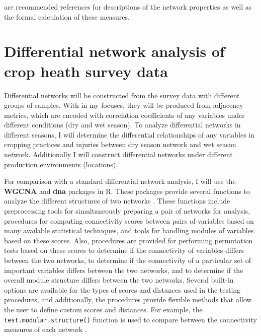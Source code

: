 \citet{Deng:2012do, Toubiana:2013cv, horvath2011weighted, newman2003structure} are recommended references for descriptions of the network properties as well as the formal calculation of these measures.

\section*{Differential network analysis of crop heath survey data}


Differential networks will be constructed from the survey data with different groups of samples. With in my focuses, they will be produced from adjacency metrics, which are encoded with correlation coefficients of any variables under different conditions (dry and wet season). To analyze differential networks in different seasons, I will determine the differential relationships of any variables in cropping practices and injuries between dry season network and wet season network. Additionally I will construct differential networks under different production environments (locations).

For comparison with a standard differential network analysis, I will use the \textbf{WGCNA} \citep{horvath2011weighted} and \textbf{dna} \citep{dnapackage} packages in \textsf{R}. These packages provide several functions to analyze the different structures of two networks \citep{horvath2011weighted}. These functions include preprocessing tools for simultaneously preparing a pair of networks for analysis, procedures for computing connectivity scores between pairs of variables based on many available statistical techniques, and tools for handling modules of variables based on these scores. Also, procedures are provided for performing permutation tests based on these scores to determine if the connectivity of variables differs between the two networks, to determine if the connectivity of a particular set of important variables differs between the two networks, and to determine if the overall module structure differs between the two networks. Several built-in options are available for the types of scores and distances used in the testing procedures, and additionally, the procedures provide flexible methods that allow the user to define custom scores and distances. For example, the \texttt{test.modular.structure()} function is used to compare between the connectivity measures of each network \citep{dnapackage}.
 

